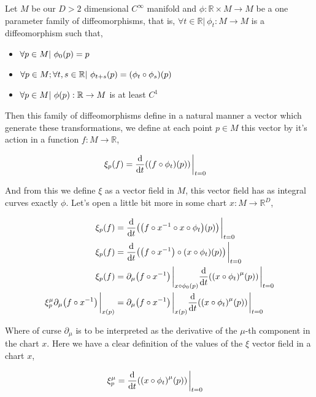 \problem{}
\probitem{}

Let $M$ be our $D>2$ dimensional $C^\infty$ manifold and $\phi:\mathbb R\times M\rightarrow M$ be a one parameter family of diffeomorphisms, that is, $\forall t\in\mathbb R|\ \phi_t:M\rightarrow M$ is a diffeomorphism such that, 

\begin{itemize}
    \item $\forall p\in M|\ \phi_0\qty(p)=p$
    \item $\forall p\in M; \forall t,s\in\mathbb R|\ \phi_{t+s}\qty(p)=\qty(\phi_t\circ\phi_s)\qty(p)$
    \item $\forall p\in M|\ \phi\qty(p):\mathbb R\rightarrow M$ is at least $C^1$
\end{itemize}

Then this family of diffeomorphisms define in a natural manner a vector which generate these transformations, 
we define at each point $p\in M$ this vector by it's action in a function $f:M\rightarrow \mathbb R$,

\begin{align*}
    \xi_p\qty(f)&=\dv{}{t}\qty(\qty(f\circ\phi_t)\qty(p))\eval_{t=0}
\end{align*}

And from this we define $\xi$ as a vector field in $M$, this vector field has as integral curves exactly $\phi$. Let's 
open a little bit more in some chart $x:M\rightarrow \mathbb R^D$,

\begin{align*}
    \xi_p\qty(f)&=\dv{}{t}\qty(\qty(f\circ x^{-1}\circ x\circ\phi_t)\qty(p))\eval_{t=0}\\
    \xi_p\qty(f)&=\dv{}{t}\qty(\qty(f\circ x^{-1})\circ\qty(x\circ\phi_t)\qty(p))\eval_{t=0}\\
    \xi_p\qty(f)&=\partial_\mu\qty(f\circ x^{-1})\eval_{x\circ\phi_0\qty(p)}\dv{}{t}\qty(\qty(x\circ\phi_t)^\mu\qty(p))\eval_{t=0}\\
    \xi_p^\mu\partial_\mu\qty(f\circ x^{-1})\eval_{x\qty(p)}&=\partial_\mu\qty(f\circ x^{-1})\eval_{x\qty(p)}\dv{}{t}\qty(\qty(x\circ\phi_t)^\mu\qty(p))\eval_{t=0}
\end{align*}

Where of curse $\partial_\mu$ is to be interpreted as the derivative of the $\mu$-th component in the chart $x$. Here we have a clear definition of the 
values of the $\xi$ vector field in a chart $x$,

\begin{align*}
    \xi_p^\mu&=\dv{}{t}\qty(\qty(x\circ\phi_t)^\mu\qty(p))\eval_{t=0}
\end{align*}

